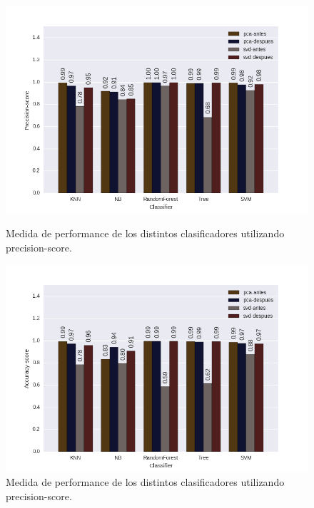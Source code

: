 \begin{figure}[!tbp]
  \centering
  \begin{minipage}[b]{1\textwidth}
  	\centering
  	\includegraphics[width=1\textwidth]{../results/precision.png}
    \caption{Medida de performance de los distintos clasificadores utilizando precision-score.}
	\label{figure:precision}
  \end{minipage}
  \hfill
  \begin{minipage}[b]{1\textwidth}
  	\centering
	\includegraphics[width=1\textwidth]{../results/accuracy.png}
    \caption{Medida de performance de los distintos clasificadores utilizando precision-score.}
	\label{figure:accuracy}  
  \end{minipage}
\end{figure}

